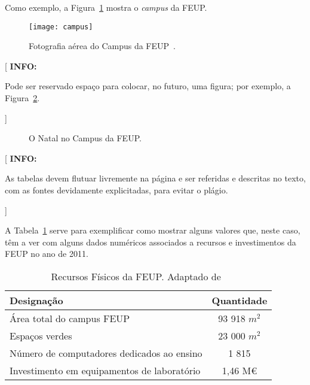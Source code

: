 \documentclass[11pt,a4paper]{report}
\newenvironment{info}[1]{\vspace*{6mm}\color{blue}[ \textbf{INFO:} \begin{em} #1}
                        {\vspace*{3mm}\end{em} ]}
\begin{document}
Como exemplo, a Figura~\ref{fig:campus} %
mostra o \emph{campus} da FEUP. 

\lipsum[1]

\begin{figure}
\centering
\texttt{[image: campus]}
\caption[Fotografia aérea do Campus da FEUP]{Fotografia aérea do Campus da FEUP~\cite{kn:figura}.} \label{fig:campus}
\end{figure}

\lipsum[2]

\begin{info}
Pode ser reservado espaço para colocar, no futuro, uma figura; por
exemplo, a Figura~\ref{fig:natal}.
\end{info}

\lipsum[3]

\begin{figure} [b]
  \centering
  \caption{O Natal no Campus da FEUP.} \label{fig:natal}
\end{figure}

\lipsum[4]

\begin{info}
As tabelas devem flutuar livremente na página e ser referidas e
descritas no texto, com as fontes devidamente explicitadas, para
evitar o plágio.
\end{info}

A Tabela~\ref{tab:feup} %
serve para exemplificar como mostrar alguns valores que, neste caso, têm
a ver com alguns dados numéricos associados a recursos e investimentos
da FEUP no ano de 2011. 

\lipsum[4]

\begin{table}
  \centering
  \caption[Recursos Físicos da FEUP]{Recursos Físicos da FEUP. Adaptado de~\cite{kn:tabela}}
  \begin{tabular}{| l | c |}
    \hline
    \textbf{Designação} & \textbf{Quantidade}\\\hline
    \hline
    Área total do campus FEUP & 93 918 $m^2$\\\hline
    Espaços verdes & 23 000 $m^2$\\\hline
    Número de computadores dedicados ao ensino & 1 815\\\hline
    Investimento em equipamentos de laboratório & 1,46 M€\\
    \hline
  \end{tabular}
  \label{tab:feup}
\end{table}
\end{document}

